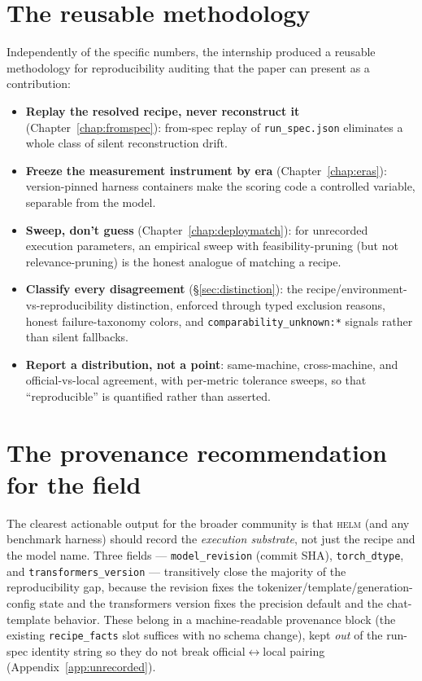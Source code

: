 \documentclass[11pt]{report}
\newcommand{\code}[1]{\texttt{#1}}
\newcommand{\file}[1]{\texttt{#1}}
\begin{document}
\section{The reusable methodology}

Independently of the specific numbers, the internship produced a reusable
methodology for reproducibility auditing that the paper can present as a
contribution:

\begin{itemize}[nosep]
  \item \textbf{Replay the resolved recipe, never reconstruct it}
        (Chapter~\ref{chap:fromspec}): from-spec replay of \file{run\_spec.json}
        eliminates a whole class of silent reconstruction drift.
  \item \textbf{Freeze the measurement instrument by era}
        (Chapter~\ref{chap:eras}): version-pinned harness containers make the
        scoring code a controlled variable, separable from the model.
  \item \textbf{Sweep, don't guess} (Chapter~\ref{chap:deploymatch}): for unrecorded
        execution parameters, an empirical sweep with feasibility-pruning (but not
        relevance-pruning) is the honest analogue of matching a recipe.
  \item \textbf{Classify every disagreement} (\S\ref{sec:distinction}): the
        recipe/environment-vs-reproducibility distinction, enforced through typed
        exclusion reasons, honest failure-taxonomy colors, and
        \code{comparability\_unknown:*} signals rather than silent fallbacks.
  \item \textbf{Report a distribution, not a point}: same-machine, cross-machine,
        and official-vs-local agreement, with per-metric tolerance sweeps, so that
        ``reproducible'' is quantified rather than asserted.
\end{itemize}

\section{The provenance recommendation for the field}

The clearest actionable output for the broader community is that \textsc{helm} (and
any benchmark harness) should record the \emph{execution substrate}, not just the
recipe and the model name. Three fields --- \code{model\_revision} (commit SHA),
\code{torch\_dtype}, and \code{transformers\_version} --- transitively close the
majority of the reproducibility gap, because the revision fixes the
tokenizer/template/generation-config state and the transformers version fixes the
precision default and the chat-template behavior. These belong in a machine-readable
provenance block (the existing \code{recipe\_facts} slot suffices with no schema
change), kept \emph{out} of the run-spec identity string so they do not break
official$\leftrightarrow$local pairing (Appendix~\ref{app:unrecorded}).
\end{document}
